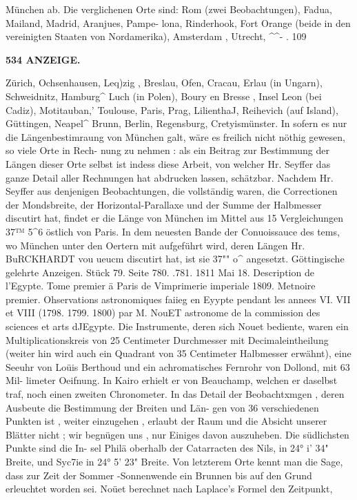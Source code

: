 \documentclass[12pt,a4paper]{article}
\begin{document}
 München  ab. Die  verglichenen  Orte  sind:  Rom  (zwei  Beobachtungen),  Fadua,  Mailand,  Madrid,  Aranjues,  Pampe- lona,  Rinderhook,  Fort  Orange   (beide  in  den  vereinigten  Staaten  von  Nordamerika),  Amsterdam ,    Utrecht, \textasciicircum{}\textasciicircum{}-   .  109

\vspace{0.5em}


\noindent\textbf{534  ANZEIGE.}

Zürich,  Ochsenhausen,  Leq)zig ,  Breslau,  Ofen,  Cracau,  Erlau  (in  Ungarn),  Schweidnitz,  Hamburg\textasciicircum{}  Luch (in  Polen),  Boury  en  Bresse ,  Insel  Leon  (bei  Cadiz),  Motitauban,'  Toulouse,  Paris,  Prag,  LilienthaJ, Reihevich  (auf  Island),  Güttingen,  Neapel\textasciicircum{}  Brunn,  Berlin,  Regensburg,  Cretyismünster.  In  sofern  es  nur die  Längenbestimraung  von  München  galt,  wäre  es  freilich  nicht  nöthig  gewesen,  so  viele  Orte  in  Rech- nung zu  nehmen :  als  ein  Beitrag  zur  Bestimmung  der  Längen  dieser  Orte  selbst  ist  indess  diese  Arbeit, von  welcher  Hr.  Seyffer  das  ganze  Detail  aller  Rechnungen  hat  abdrucken  lassen,  schätzbar. Nachdem  Hr.  Seyffer  aus  denjenigen  Beobachtungen,  die  vollständig  waren,  die  Correctionen der  Mondsbreite,  der  Horizontal-Parallaxe  und  der  Summe  der  Halbmesser  discutirt  hat,  findet  er  die Länge  von  München  im  Mittel  aus  15  Vergleichungen  37™  5\textasciicircum{}6  östlich  von  Paris.  In  dem  neuesten  Bande der  Conuoissauce  des  tems,  wo  München  unter  den  Oertern  mit  aufgeführt  wird,  deren  Längen  Hr. BuRCKHARDT  vou  ueucm  discutirt  hat,  ist  sie  37""  o\textasciicircum{}  angesetzt. Göttingische  gelehrte  Anzeigen.     Stück  79.     Seite  780. .781.     1811  Mai  18. Description  de  l'Egypte.  Tome  premier  ä  Paris  de  Vimprimerie  imperiale  1809.  Metnoire  premier. Ohservations  astronomiques  faiieg  en  Eyypte  pendant  les  annees  VI.  VII  et  VIII  (1798.  1799.  1800)  par  M. NouET  astronome  de  la  commission  des  sciences  et  arts  dJEgypte. Die  Instrumente,  deren  sich  Nouet  bediente,  waren  ein  Multiplicationskreis  von  25  Centimeter Durchmesser  mit  Decimaleintheilung  (weiter  hin  wird  auch  ein  Quadrant  von  35  Centimeter  Halbmesser erwähnt),  eine  Seeuhr  von  Loüis  Berthoud  und  ein  achromatisches  Fernrohr  von  Dollond,  mit  63  Mil- limeter Oeifnung.  In  Kairo  erhielt  er  von  Beauchamp,  welchen  er  daselbst  traf,  noch  einen  zweiten Chronometer.  In  das  Detail  der  Beobachtxmgen ,  deren  Ausbeute  die  Bestimmung  der  Breiten  und  Län- gen von  36  verschiedenen  Punkten  ist ,  weiter  einzugehen ,  erlaubt  der  Raum  und  die  Absicht  unserer Blätter  nicht ;  wir  begnügen  uns ,  nur  Einiges  davon  auszuheben.  Die  südlichsten  Punkte  sind  die  In- sel Philä  oberhalb  der  Catarracten  des  Nils,  in  24°  i'  34"  Breite,  und  Syc7ie  in  24°  5'  23"  Breite.  Von letzterem  Orte  kennt  man  die  Sage,  dass  zur  Zeit  der  Sommer -Sonnenwende  ein  Brunnen  bis  auf  den Grund  erleuchtet  worden  sei.  Noüet  berechnet  nach  Laplace's  Formel  den  Zeitpunkt,  
\end{document}
